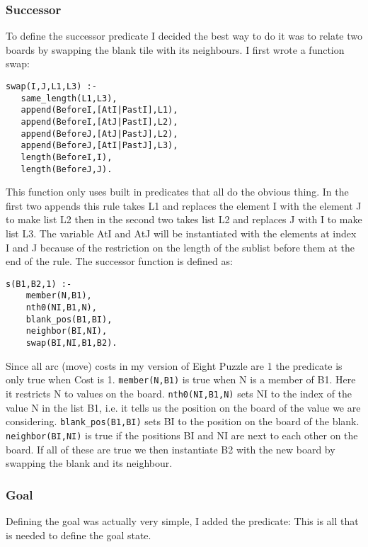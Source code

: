\documentclass[a4paper,12pt]{report}
\begin{document}
\subsubsection{Successor}
To define the successor predicate I decided the best way to do it was to relate two boards by swapping the blank tile with its neighbours. I first wrote a function swap:
\begin{verbatim}
swap(I,J,L1,L3) :-
   same_length(L1,L3),
   append(BeforeI,[AtI|PastI],L1),
   append(BeforeI,[AtJ|PastI],L2),
   append(BeforeJ,[AtJ|PastJ],L2),
   append(BeforeJ,[AtI|PastJ],L3),
   length(BeforeI,I),
   length(BeforeJ,J).
\end{verbatim}
This function only uses built in predicates that all do the obvious thing. In the first two appends this rule takes L1 and replaces the element I with the element J to make list L2 then in the second two takes list L2 and replaces J with I to make list L3. The variable AtI and AtJ will be instantiated with the elements at index I and J because of the restriction on the length of the sublist before them at the end of the rule.
The successor function is defined as:
\begin{verbatim}
s(B1,B2,1) :-
    member(N,B1),
    nth0(NI,B1,N),
    blank_pos(B1,BI),
    neighbor(BI,NI),
    swap(BI,NI,B1,B2).
\end{verbatim}
Since all arc (move) costs in my version of Eight Puzzle are 1 the predicate is only true when Cost is 1. \texttt{member(N,B1)} is true when N is a member of B1. Here it restricts N to values on the board. \texttt{nth0(NI,B1,N)} sets NI to the index of the value N in the list B1, i.e. it tells us the position on the board of the value we are considering. \texttt{blank_pos(B1,BI)} sets BI to the position on the board of the blank. \texttt{neighbor(BI,NI)} is true if the positions BI and NI are next to each other on the board. If all of these are true we then instantiate B2 with the new board by swapping the blank and its neighbour.
\subsubsection{Goal}
Defining the goal was actually very simple, I added the predicate: 
\noindent This is all that is needed to define the goal state.
\end{document}
